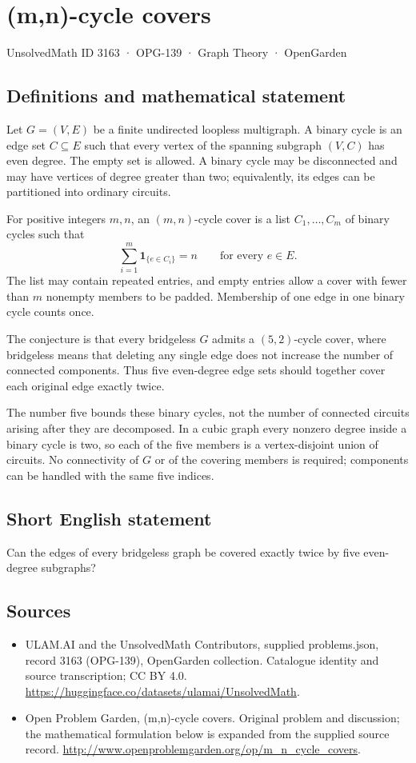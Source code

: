 \documentclass[11pt,a4paper]{article}
\begin{document}
\section*{(m,n)-cycle covers}\label{3163}
{\small UnsolvedMath ID 3163 · OPG-139 · Graph Theory · OpenGarden}
\subsection{Definitions and mathematical statement}
Let $G=(V,E)$ be a finite undirected loopless multigraph.
A binary cycle is an edge set $C\subseteq E$ such that every
vertex of the spanning subgraph $(V,C)$ has even degree.
The empty set is allowed. A binary cycle may be disconnected
and may have vertices of degree greater than two; equivalently,
its edges can be partitioned into ordinary circuits.

For positive integers $m,n$, an $(m,n)$-cycle cover is a list
$C_1,\ldots,C_m$ of binary cycles such that
\[
 \sum_{i=1}^m\mathbf1_{\{e\in C_i\}}=n
 \qquad\text{for every }e\in E.
\]
The list may contain repeated entries, and empty entries allow
a cover with fewer than $m$ nonempty members to be padded.
Membership of one edge in one binary cycle counts once.

The conjecture is that every bridgeless $G$ admits a
$(5,2)$-cycle cover, where bridgeless means that deleting any
single edge does not increase the number of connected
components. Thus five even-degree edge sets should together
cover each original edge exactly twice.

The number five bounds these binary cycles, not the number
of connected circuits arising after they are decomposed.
In a cubic graph every nonzero degree inside a binary cycle
is two, so each of the five members is a vertex-disjoint union
of circuits. No connectivity of $G$ or of the covering members
is required; components can be handled with the same five
indices.
\subsection{Short English statement}
Can the edges of every bridgeless graph be covered exactly twice by five even-degree subgraphs?
\subsection{Sources}
\begin{itemize}
\item[S1] ULAM.AI and the UnsolvedMath Contributors, supplied problems.json, record 3163 (OPG-139), OpenGarden collection. Catalogue identity and source transcription; CC BY 4.0.
\url{https://huggingface.co/datasets/ulamai/UnsolvedMath}.
\item[S2] Open Problem Garden, (m,n)-cycle covers. Original problem and discussion; the mathematical formulation below is expanded from the supplied source record.
\url{http://www.openproblemgarden.org/op/m_n_cycle_covers}.
\end{itemize}
\end{document}

